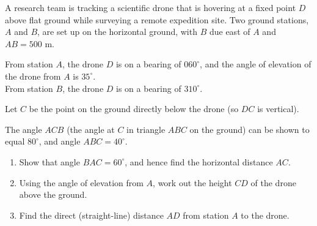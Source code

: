\begin{question}
\noindent A research team is tracking a scientific drone that is hovering at a fixed point $D$ above flat ground while surveying a remote expedition site. Two ground stations, $A$ and $B$, are set up on the horizontal ground, with $B$ due east of $A$ and $AB = 500$ m.

\noindent From station $A$, the drone $D$ is on a bearing of $060^\circ$, and the angle of elevation of the drone from $A$ is $35^\circ$.\\
From station $B$, the drone $D$ is on a bearing of $310^\circ$.

\noindent Let $C$ be the point on the ground directly below the drone (so $DC$ is vertical).

\begin{center}
\end{center}

\noindent The angle $ACB$ (the angle at $C$ in triangle $ABC$ on the ground) can be shown to equal $80^\circ$, and angle $ABC = 40^\circ$.

\begin{enumerate}
    \item[(a)] Show that angle $BAC = 60^\circ$, and hence find the horizontal distance $AC$.
    \vspace{4cm}

    \item[(b)] Using the angle of elevation from $A$, work out the height $CD$ of the drone above the ground.
    \vspace{3.5cm}

    \item[(c)] Find the direct (straight-line) distance $AD$ from station $A$ to the drone.
    \vspace{3.5cm}
\end{enumerate}
\end{question}
